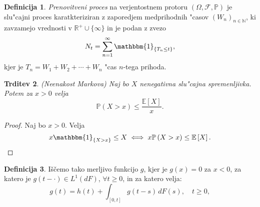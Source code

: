 \documentclass[12pt, a4paper, reqno]{amsart}
\theoremstyle{definition}
\newtheorem{definicija}{Definicija}[section]
\theoremstyle{plain}
\newtheorem{trditev}[definicija]{Trditev}
\newcommand{\R}{\mathbb{R}}
\newcommand{\N}{\mathbb{N}}
\newcommand{\E}{\mathbb{E}}
\newcommand{\Prob}{\mathbb{P}}
\newcommand{\1}{\mathds{1}}
\begin{document}
    \begin{definicija}
        \textit{Prenovitveni proces} na verjentostnem protoru $(\Omega, \mathcal{F}, \Prob)$ je slu"cajni 
        proces
        karatkteriziran z zaporedjem medprihodnih "casov $(W_n)_{n\in\N}$, ki zavzamejo vrednosti
        v $\R^+\cup\{\infty\}$ in je podan z zvezo 
        \begin{equation*}
            N_t = \sum_{n=1}^{\infty}\mathbbm{1}_{\{T_n\leq t\}},
        \end{equation*}
        kjer je $T_n = W_1 + W_2 + \cdots + W_n$ "cas $n$-tega prihoda.
        \label{def:PrenovitveniProces}
    \end{definicija}

    \begin{trditev}(Neenakost Markova)
        \label{trd:neenakostMarkova}
        Naj bo $X$ nenegativna slu"cajna spremenljivka.
        Potem za  $x>0$ velja
        \begin{equation*}
            \Prob\left(X > x\right) \leq \frac{\E\left[X\right]}{x}.
        \end{equation*}
    \end{trditev}

    \begin{proof}
        Naj bo $x > 0$. Velja
        \begin{equation*}
            x\mathbbm{1}_{\{X > x\}} \leq X \iff x\Prob\left(X > x\right) \leq \E\left[X\right].
        \end{equation*}
    \end{proof}

    \begin{definicija}
        Iščemo tako merljivo funkcijo \( g \), kjer je \( g(x) = 0 \) za \( x < 0 \), 
        za katero je 
        \( g(t - \cdot) \in L^1(dF) \), \( \forall t \geq 0 \), in za katero velja:
        \begin{equation}
            g(t) = h(t) + \int_{[0,t]} g(t - s) \, dF(s), \quad t \geq 0,
        \end{equation}
        \label{def:prenovitvenaEnacba}
    \end{definicija}
\end{document}
